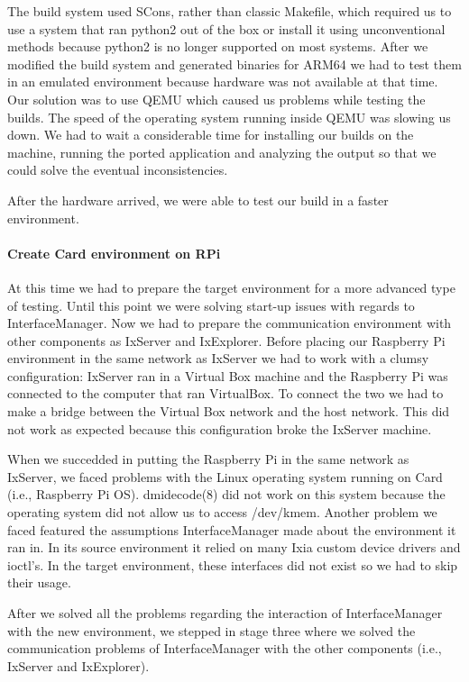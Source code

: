 The build system used SCons, rather than classic Makefile, which required us to
use a system that ran python2 out of the box or install it using unconventional
methods because python2 is no longer supported on most systems. After we
modified the build system and generated binaries for ARM64 we had to test them
in an emulated environment because hardware was not available at that time. Our
solution was to use QEMU which caused us problems while testing the builds.
The speed of the operating system running inside QEMU was slowing us down. We
had to wait a considerable time for installing our builds on the
machine, running the ported application and analyzing the output so that we
could solve the eventual inconsistencies.

After the hardware arrived, we were able to test our build in a faster
environment.

\paragraph{Create Card environment on RPi}

At this time we had to prepare the target environment for a more advanced
type of testing. Until this point we were solving start-up issues with regards
to InterfaceManager. Now we had to prepare the communication environment with
other components as IxServer and IxExplorer. Before placing our Raspberry Pi
environment in the same network as IxServer we had to work with a clumsy
configuration: IxServer ran in a Virtual Box machine and the Raspberry Pi was
connected to the computer that ran VirtualBox. To connect the two we had to make
a bridge between the Virtual Box network and the host network. This did not work
as expected because this configuration broke the IxServer machine.

When we succedded in putting the Raspberry Pi in the same network as IxServer,
we faced problems with the Linux operating system running on Card (i.e.,
Raspberry Pi OS). dmidecode(8) did not work on this system because the operating
system did not allow us to access /dev/kmem. Another problem we faced featured
the assumptions InterfaceManager made about the environment it ran in. In its
source environment it relied on many Ixia custom device drivers and ioctl's.
In the target environment, these interfaces did not exist so we had to
skip their usage.

After we solved all the problems regarding the interaction of InterfaceManager
with the new environment, we stepped in stage three where we solved the
communication problems of InterfaceManager with the other components (i.e.,
IxServer and IxExplorer).

